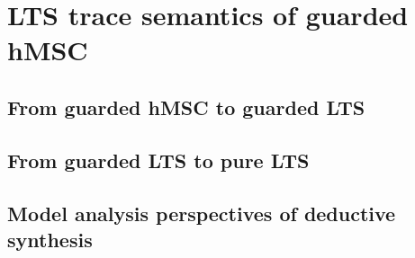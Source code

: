 \chapter{LTS trace semantics of guarded hMSC\label{chapter:deductive}}
  \section{From guarded hMSC to guarded LTS}
  \section{From guarded LTS to pure LTS}
  \section{Model analysis perspectives of deductive synthesis}

